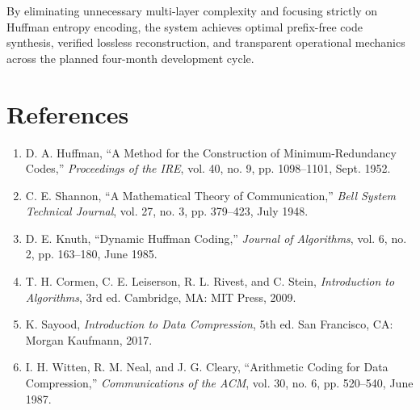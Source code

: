 \documentclass[12pt,a4paper]{article}
\begin{document}
By eliminating unnecessary multi-layer complexity and focusing strictly on Huffman entropy encoding, the system achieves optimal prefix-free code synthesis, verified lossless reconstruction, and transparent operational mechanics across the planned four-month development cycle.

\section{References}

\begin{enumerate}[itemsep=1pt,topsep=2pt,parsep=0pt]
    \item D. A. Huffman, ``A Method for the Construction of Minimum-Redundancy Codes,'' \textit{Proceedings of the IRE}, vol. 40, no. 9, pp. 1098--1101, Sept. 1952.
    \item C. E. Shannon, ``A Mathematical Theory of Communication,'' \textit{Bell System Technical Journal}, vol. 27, no. 3, pp. 379--423, July 1948.
    \item D. E. Knuth, ``Dynamic Huffman Coding,'' \textit{Journal of Algorithms}, vol. 6, no. 2, pp. 163--180, June 1985.
    \item T. H. Cormen, C. E. Leiserson, R. L. Rivest, and C. Stein, \textit{Introduction to Algorithms}, 3rd ed. Cambridge, MA: MIT Press, 2009.
    \item K. Sayood, \textit{Introduction to Data Compression}, 5th ed. San Francisco, CA: Morgan Kaufmann, 2017.
    \item I. H. Witten, R. M. Neal, and J. G. Cleary, ``Arithmetic Coding for Data Compression,'' \textit{Communications of the ACM}, vol. 30, no. 6, pp. 520--540, June 1987.
\end{enumerate}
\end{document}
